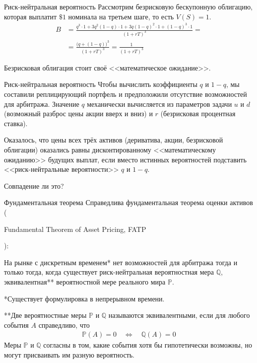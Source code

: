 \documentclass{beamer}
\newcommand{\en}[1]{\begin{otherlanguage}{english}#1\end{otherlanguage}}
\begin{document}
\begin{frame}{Риск-нейтральная вероятность}
\justify
Рассмотрим безрисковую бескупонную облигацию, которая выплатит $\$1$ номинала на третьем шаге, то есть $V(S) = 1$.
\begin{align*}
B &= \frac{q^3 \cdot 1 + 3q^2(1-q) \cdot 1 + 3q(1-q)^2 \cdot 1 + (1-q)^3 \cdot 1}{(1+rT)^3} = \\
&= \frac{\Big(q + (1-q) \Big)^3}{(1+rT)^3} = \frac{1}{(1+rT)^3}
\end{align*}

\justify
Безрисковая облигация стоит своё <<математическое ожидание>>.
\end{frame}



\begin{frame}{Риск-нейтральная вероятность}
\justify
Чтобы вычислить коэффициенты $q$ и $1-q$, мы составили реплицирующий портфель и предположили отсутствие возможностей для арбитража. Значение $q$ механически вычисляется из параметров задачи $u$ и $d$ (возможный разброс цены акции вверх и вниз) и $r$ (безрисковая процентная ставка).

\justify
Оказалось, что цены всех трёх активов (дериватива, акции, безрисковой облигации) оказались равны дисконтированному <<математическому ожиданию>> будущих выплат, если вместо истинных вероятностей подставить <<риск-нейтральные вероятности>> $q$ и $1-q$.

\justify
Совпадение ли это?
\end{frame}



\begin{frame}{Фундаментальная теорема}
\justify
Справедлива фундаментальная теорема оценки активов (\en{Fundamental Theorem of Asset Pricing, FATP}):

\justify
На рынке с дискретным временем* нет возможностей для арбитража тогда и только тогда, когда существует риск-нейтральная вероятностная мера $\mathbb{Q}$, эквивалентная** вероятностной мере реального мира $\mathbb{P}$.

\justify
*Существует формулировка в непрерывном времени.

\justify
**Две вероятностные меры $\mathbb{P}$ и $\mathbb{Q}$ называются эквивалентными, если для любого события $A$ справедливо, что
\begin{align*}
\mathbb{P}(A)=0 \quad \Leftrightarrow \quad \mathbb{Q}(A)=0
\end{align*}
Меры $\mathbb{P}$ и $\mathbb{Q}$ согласны в том, какие события хотя бы гипотетически возможны, но могут присваивать им разную вероятность.
\end{frame}
\end{document}

